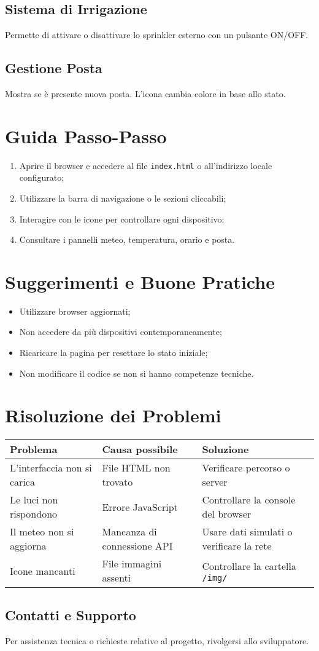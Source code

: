 \documentclass[a4paper,12pt]{article}
\begin{document}
\subsection*{Sistema di Irrigazione}
Permette di attivare o disattivare lo sprinkler esterno con un pulsante ON/OFF.

\subsection*{Gestione Posta}
Mostra se è presente nuova posta. L’icona cambia colore in base allo stato.

\section{Guida Passo-Passo}

\begin{enumerate}
  \item Aprire il browser e accedere al file \texttt{index.html} o all’indirizzo locale configurato;
  \item Utilizzare la barra di navigazione o le sezioni cliccabili;
  \item Interagire con le icone per controllare ogni dispositivo;
  \item Consultare i pannelli meteo, temperatura, orario e posta.
\end{enumerate}

\section{Suggerimenti e Buone Pratiche}

\begin{itemize}
  \item Utilizzare browser aggiornati;
  \item Non accedere da più dispositivi contemporaneamente;
  \item Ricaricare la pagina per resettare lo stato iniziale;
  \item Non modificare il codice se non si hanno competenze tecniche.
\end{itemize}

\section{Risoluzione dei Problemi}

\begin{tabular}{|p{5cm}|p{5cm}|p{5cm}|}
\hline
\textbf{Problema} & \textbf{Causa possibile} & \textbf{Soluzione} \\
\hline
L’interfaccia non si carica & File HTML non trovato & Verificare percorso o server \\
\hline
Le luci non rispondono & Errore JavaScript & Controllare la console del browser \\
\hline
Il meteo non si aggiorna & Mancanza di connessione API & Usare dati simulati o verificare la rete \\
\hline
Icone mancanti & File immagini assenti & Controllare la cartella \texttt{/img/} \\
\hline
\end{tabular}

\subsection{Contatti e Supporto}

Per assistenza tecnica o richieste relative al progetto, rivolgersi allo sviluppatore.
\end{document}
